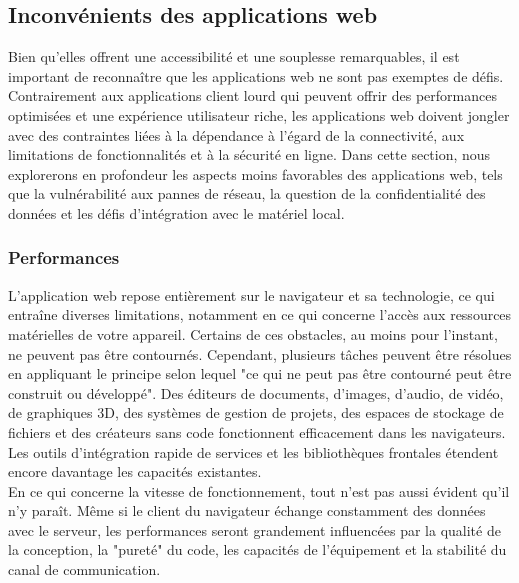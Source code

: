 \documentclass[a4paper, 12pt, french]{article}
\begin{document}
		\subsection{Inconvénients des applications web}
			Bien qu'elles offrent une accessibilité et une souplesse remarquables, il est important de reconnaître que les applications web ne sont pas exemptes de défis. Contrairement aux applications client lourd qui peuvent offrir des performances optimisées et une expérience utilisateur riche, les applications web doivent jongler avec des contraintes liées à la dépendance à l'égard de la connectivité, aux limitations de fonctionnalités et à la sécurité en ligne. Dans cette section, nous explorerons en profondeur les aspects moins favorables des applications web, tels que la vulnérabilité aux pannes de réseau, la question de la confidentialité des données et les défis d'intégration avec le matériel local.
						
			\subsubsection{Performances}
				L'application web repose entièrement sur le navigateur et sa technologie, ce qui entraîne diverses limitations, notamment en ce qui concerne l'accès aux ressources matérielles de votre appareil. Certains de ces obstacles, au moins pour l'instant, ne peuvent pas être contournés. Cependant, plusieurs tâches peuvent être résolues en appliquant le principe selon lequel "ce qui ne peut pas être contourné peut être construit ou développé". Des éditeurs de documents, d'images, d'audio, de vidéo, de graphiques 3D, des systèmes de gestion de projets, des espaces de stockage de fichiers et des créateurs sans code fonctionnent efficacement dans les navigateurs. Les outils d'intégration rapide de services et les bibliothèques frontales étendent encore davantage les capacités existantes.\\

				En ce qui concerne la vitesse de fonctionnement, tout n'est pas aussi évident qu'il n'y paraît. Même si le client du navigateur échange constamment des données avec le serveur, les performances seront grandement influencées par la qualité de la conception, la "pureté" du code, les capacités de l'équipement et la stabilité du canal de communication.
\end{document}
